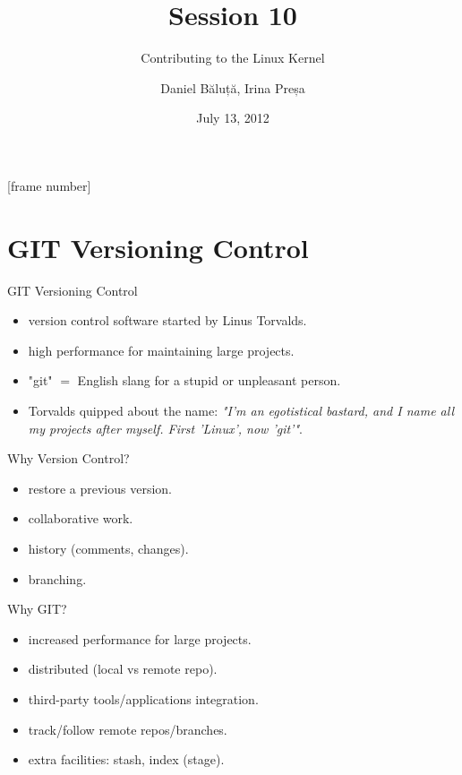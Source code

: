 \documentclass{workshop}
\title[Sesssion 10]{Session 10}
\subtitle{Contributing to the Linux Kernel}
\author{Daniel Băluță, Irina Preșa}
\date{July 13, 2012}
\begin{document}
[frame number]

\frame{\titlepage}

\section{GIT Versioning Control}

\begin{frame}{GIT Versioning Control}
\begin{itemize}
\item version control software started by Linus Torvalds.
\item high performance for maintaining large projects.
\item<2> "git" $=$ English slang for a stupid or unpleasant person.
\item<2> Torvalds quipped about the name: \emph{"I'm an egotistical bastard, and I
name all my projects after myself. First 'Linux', now 'git'"}.
\end{itemize}
\end{frame}

\begin{frame}{Why Version Control?}
\begin{itemize}
\item restore a previous version.
\item collaborative work.
\item history (comments, changes).
\item branching.
\end{itemize}
\end{frame}

\begin{frame}{Why GIT?}
\begin{itemize}
\item increased performance for large projects.
\item distributed (local vs remote repo).
\item third-party tools/applications integration.
\item track/follow remote repos/branches.
\item extra facilities: stash, index (stage).
\end{itemize}
\end{frame}
\end{document}
